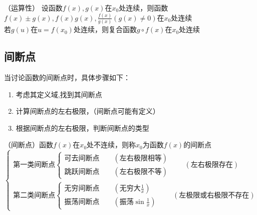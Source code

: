 \begin{theorem}
    \label{th:连续函数运算性}
    （运算性）
    设函数$f(x),g(x)$在$x_0$处连续，则函数$f(x)\pm g(x), f(x)g(x), \frac{f(x)}{g(x)} (g(x)\neq 0)$在$x_0$处连续
    \\
    若$g(u)$在$u=f(x_0)$处连续，则复合函数$g\circ f(x)$在$x_0$处连续
\end{theorem}

\subsection{间断点}
当讨论函数的间断点时，具体步骤如下：
\begin{enumerate}
    \item 考虑其定义域,找到其间断点
    \item 计算间断点的左右极限，（间断点可能有定义）
    \item 根据间断点的左右极限，判断间断点的类型
\end{enumerate}
\begin{definition}
    （间断点）函数$f(x)$在$x_0$处不连续，则称$x_0$为函数$f(x)$的间断点\\
    \begin{math}
        \begin{cases}
            \text{第一类间断点}
            \begin{cases}
                \text{可去间断点}\qquad (\text{左右极限相等}) \\
                \text{跳跃间断点}\qquad (\text{左右极限不等})
            \end{cases}
            \qquad (\text{左右极限存在})
            \\
            \text{第二类间断点}
            \begin{cases}
                \text{无穷间断点}\qquad (\text{无穷大}\frac{1}{x}) \\
                \text{振荡间断点}\qquad (\text{振荡}\sin\frac{1}{x})
            \end{cases}
            \qquad (\text{左极限或右极限不存在})
        \end{cases}
    \end{math}
\end{definition}
